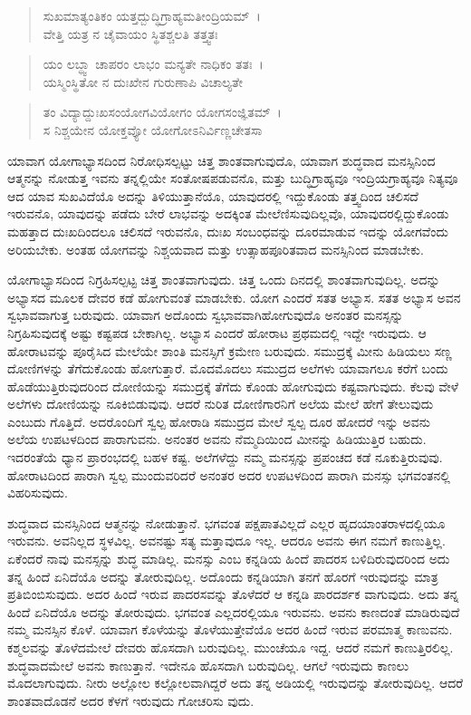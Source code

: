 \begin{verse}
ಸುಖಮಾತ್ಯಂತಿಕಂ ಯತ್ತದ್ಬುದ್ಧಿಗ್ರಾಹ್ಯಮತೀಂದ್ರಿಯಮ್~।\\ವೇತ್ತಿ ಯತ್ರ ನ ಚೈವಾಯಂ ಸ್ಥಿತಶ್ಚಲತಿ ತತ್ತ್ವತಃ 
\end{verse}

\begin{verse}
ಯಂ ಲಬ್ಧ್ವಾ ಚಾಪರಂ ಲಾಭಂ ಮನ್ಯತೇ ನಾಧಿಕಂ ತತಃ~।\\ಯಸ್ಮಿಂಸ್ಥಿತೋ ನ ದುಃಖೇನ ಗುರುಣಾಪಿ ವಿಚಾಲ್ಯತೇ 
\end{verse}

\begin{verse}
ತಂ ವಿದ್ಯಾದ್ದುಃಖಸಂಯೋಗವಿಯೋಗಂ ಯೋಗಸಂಜ್ಞಿತಮ್~।\\ಸ ನಿಶ್ಚಯೇನ ಯೋಕ್ತವ್ಯೋ ಯೋಗೋಽನಿರ್ವಿಣ್ಣಚೇತಸಾ 
\end{verse}

{\small ಯಾವಾಗ ಯೋಗಾಭ್ಯಾಸದಿಂದ ನಿರೋಧಿಸಲ್ಪಟ್ಟು ಚಿತ್ತ ಶಾಂತವಾಗುವುದೊ, ಯಾವಾಗ ಶುದ್ಧವಾದ ಮನಸ್ಸಿನಿಂದ ಆತ್ಮನನ್ನು ನೋಡುತ್ತ ಇವನು ತನ್ನಲ್ಲಿಯೇ ಸಂತೋಷಪಡುವನೊ, ಮತ್ತು ಬುದ್ಧಿಗ್ರಾಹ್ಯವೂ ಇಂದ್ರಿಯಗ್ರಾಹ್ಯವೂ ನಿತ್ಯವೂ ಆದ ಯಾವ ಸುಖವಿದೆಯೊ ಅದನ್ನು ತಿಳಿಯುತ್ತಾನೆಯೊ, ಯಾವುದರಲ್ಲಿ ಇದ್ದುಕೊಂಡು ತತ್ತ್ವದಿಂದ ಚಲಿಸದೆ ಇರುವನೊ, ಯಾವುದನ್ನು ಪಡೆದು ಬೇರೆ ಲಾಭವನ್ನು ಅದಕ್ಕಿಂತ ಮೇಲೆಣಿಸುವುದಿಲ್ಲವೊ, ಯಾವುದರಲ್ಲಿದ್ದುಕೊಂಡು ಮಹತ್ತಾದ ದುಃಖದಿಂದಲೂ ಚಲಿಸದೆ ಇರುವನೊ, ದುಃಖ ಸಂಬಂಧವನ್ನು ದೂರಮಾಡುವ ಇದನ್ನು ಯೋಗವೆಂದು ಅರಿಯಬೇಕು. ಅಂತಹ ಯೋಗವನ್ನು ನಿಶ್ಚಯವಾದ ಮತ್ತು ಉತ್ಸಾಹಪೂರಿತವಾದ ಮನಸ್ಸಿನಿಂದ ಮಾಡಬೇಕು.}

ಯೋಗಾಭ್ಯಾಸದಿಂದ ನಿಗ್ರಹಿಸಲ್ಪಟ್ಟ ಚಿತ್ತ ಶಾಂತವಾಗುವುದು. ಚಿತ್ತ ಒಂದು ದಿನದಲ್ಲಿ ಶಾಂತವಾಗುವುದಿಲ್ಲ. ಅದನ್ನು ಅಭ್ಯಾಸದ ಮೂಲಕ ದೇವರ ಕಡೆ ಹೋಗುವಂತೆ ಮಾಡಬೇಕು. ಯೋಗ ಎಂದರೆ ಸತತ ಅಭ್ಯಾಸ. ಸತತ ಅಭ್ಯಾಸ ಅವನ ಸ್ವಭಾವವಾಗುತ್ತ ಬರುವುದು. ಯಾವಾಗ ಅದೊಂದು ಸ್ವಭಾವವಾಗಿಹೋಗುವುದೊ ಅನಂತರ ಮನಸ್ಸನ್ನು ನಿಗ್ರಹಿಸುವುದಕ್ಕೆ ಅಷ್ಟು ಕಷ್ಟಪಡ ಬೇಕಾಗಿಲ್ಲ. ಅಭ್ಯಾಸ ಎಂದರೆ ಹೋರಾಟ ಪ್ರಥಮದಲ್ಲಿ ಇದ್ದೇ ಇರುವುದು. ಆ ಹೋರಾಟವನ್ನು ಪೂರೈಸಿದ ಮೇಲೆಯೇ ಶಾಂತಿ ಮನಸ್ಸಿಗೆ ಕ್ರಮೇಣ ಬರುವುದು. ಸಮುದ್ರಕ್ಕೆ ಮೀನು ಹಿಡಿಯಲು ಸಣ್ಣ ದೋಣಿಗಳನ್ನು ತೆಗೆದುಕೊಂಡು ಹೋಗುತ್ತಾರೆ. ಮೊದಮೊದಲು ಸಮುದ್ರದ ಅಲೆಗಳು ಯಾವಾಗಲೂ ಕರೆಗೆ ಬಂದು ಹೊಡೆಯುತ್ತಿರುವುದರಿಂದ ದೋಣಿಯನ್ನು ಸಮುದ್ರಕ್ಕೆ ತೆಗೆದು ಕೊಂಡು ಹೋಗುವುದು ಕಷ್ಟವಾಗುವುದು. ಕೆಲವು ವೇಳೆ ಅಲೆಗಳು ದೋಣಿಯನ್ನು ನೂಕಿಬಿಡುವುವು. ಆದರೆ ನುರಿತ ದೋಣಿಗಾರನಿಗೆ ಅಲೆಯ ಮೇಲೆ ಹೇಗೆ ತೇಲುವುದು ಎಂಬುದು ಗೊತ್ತಿದೆ. ಅದರೊಂದಿಗೆ ಸ್ವಲ್ಪ ಹೋರಾಡಿ ಸಮುದ್ರದ ಮೇಲೆ ಸ್ವಲ್ಪ ದೂರ ಹೋದರೆ ಇನ್ನು ಅವನು ಅಲೆಯ ಉಪಟಳದಿಂದ ಪಾರಾಗುವನು. ಅನಂತರ ಅವನು ನೆಮ್ಮದಿಯಿಂದ ಮೀನನ್ನು ಹಿಡಿಯುತ್ತಿರ ಬಹುದು. ಇದರಂತೆಯೆ ಧ್ಯಾನ ಪ್ರಾರಂಭದಲ್ಲಿ ಬಹಳ ಕಷ್ಟ. ಅಲೆಗಳೆದ್ದು ನಮ್ಮ ಮನಸ್ಸನ್ನು ಪ್ರಪಂಚದ ಕಡೆ ನೂಕುತ್ತಿರುವುವು. ಹೋರಾಟದಿಂದ ಪಾರಾಗಿ ಸ್ವಲ್ಪ ಮುಂದುವರಿದರೆ ಅನಂತರ ಅದರ ಉಪಟಳದಿಂದ ಪಾರಾಗಿ ಮನಸ್ಸು ಭಗವಂತನಲ್ಲಿ ವಿಹರಿಸುವುದು.

ಶುದ್ಧವಾದ ಮನಸ್ಸಿನಿಂದ ಆತ್ಮನನ್ನು ನೋಡುತ್ತಾನೆ. ಭಗವಂತ ಪಕ್ಷಪಾತವಿಲ್ಲದೆ ಎಲ್ಲರ ಹೃದಯಾಂತರಾಳದಲ್ಲಿಯೂ ಇರುವನು. ಅವನಿಲ್ಲದ ಸ್ಥಳವಿಲ್ಲ. ಅವನಷ್ಟು ಸತ್ಯ ಮತ್ತಾವುದೂ ಇಲ್ಲ. ಆದರೂ ಅವನು ಈಗ ನಮಗೆ ಕಾಣುತ್ತಿಲ್ಲ. ಏಕೆಂದರೆ ನಾವು ಮನಸ್ಸನ್ನು ಶುದ್ಧ ಮಾಡಿಲ್ಲ. ಮನಸ್ಸು ಎಂಬ ಕನ್ನಡಿಯ ಹಿಂದೆ ಪಾದರಸ ಬಳಿದಿರುವುದರಿಂದ ಅದು ತನ್ನ ಹಿಂದೆ ಏನಿದೆಯೊ ಅದನ್ನು ತೋರುವುದಿಲ್ಲ. ಅದೊಂದು ಕನ್ನಡಿಯಾಗಿ ತನಗೆ ಹೊರಗೆ ಇರುವುದನ್ನು ಮಾತ್ರ ಪ್ರತಿಬಿಂಬಿಸುವುದು. ಅದರ ಹಿಂದೆ ಇರುವ ಪಾದರಸವನ್ನು ತೊಳೆದರೆ ಆ ಕನ್ನಡಿ ಪಾರದರ್ಶಕ ವಾಗುವುದು. ಅದು ತನ್ನ ಹಿಂದೆ ಏನಿದೆಯೊ ಅದನ್ನು ತೋರುವುದು. ಭಗವಂತ ಎಲ್ಲದರಲ್ಲಿಯೂ ಇರುವನು. ಅವನು ಕಾಣದಂತೆ ಮಾಡಿರುವುದೆ ನಮ್ಮ ಮನಸ್ಸಿನ ಕೊಳೆ. ಯಾವಾಗ ಕೊಳೆಯನ್ನು ತೊಳೆಯುತ್ತೇವೆಯೊ ಅದರ ಹಿಂದೆ ಇರುವ ಪರಮಾತ್ಮ ಕಾಣುವನು. ಕಶ್ಮಲವನ್ನು ತೊಳೆದಮೇಲೆ ದೇವರು ಹೊಸದಾಗಿ ಬರುವುದಿಲ್ಲ. ಮುಂಚೆಯೂ ಇದ್ದ. ಆದರೆ ನಮಗೆ ಕಾಣುತ್ತಿರಲಿಲ್ಲ. ಶುದ್ಧವಾದಮೇಲೆ ಅವನು ಕಾಣುತ್ತಾನೆ. ಇದೇನೂ ಹೊಸದಾಗಿ ಬರುವುದಿಲ್ಲ. ಆಗಲೆ ಇರುವುದು ಕಾಣಲು ಮೊದಲಾಗುವುದು. ನೀರು ಅಲ್ಲೋಲ ಕಲ್ಲೋಲವಾಗಿದ್ದರೆ ಅದು ತನ್ನ ಅಡಿಯಲ್ಲಿ ಇರುವುದನ್ನು ತೋರುವುದಿಲ್ಲ. ಆದರೆ ಶಾಂತವಾದೊಡನೆ ಅದರ ಕೆಳಗೆ ಇರುವುದು ಗೋಚರಿಸು ವುದು.

